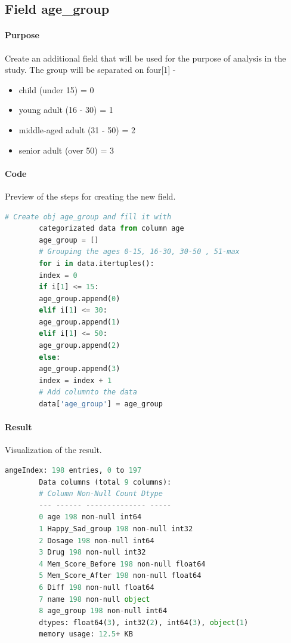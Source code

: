 \documentclass{article}
\begin{document}
    \subsection{Field age\_group}
    \paragraph{Purpose}
    Create an additional field that will be used for the purpose of analysis in the study. The group will be separated on four[1] -
    \begin{itemize}
        \item child (under 15) = 0
        \item young adult (16 - 30) = 1
        \item middle-aged adult (31 - 50) = 2
        \item senior adult (over 50) = 3
    \end{itemize}
    \paragraph{Code} Preview of the steps for creating the new field.
    \begin{lstlisting}[language=Python]
        # Create obj age_group and fill it with
        categorizated data from column age
        age_group = []
        # Grouping the ages 0-15, 16-30, 30-50 , 51-max
        for i in data.itertuples():
        index = 0
        if i[1] <= 15:
        age_group.append(0)
        elif i[1] <= 30:
        age_group.append(1)
        elif i[1] <= 50:
        age_group.append(2)
        else:
        age_group.append(3)
        index = index + 1
        # Add columnto the data
        data['age_group'] = age_group
    \end{lstlisting}
    \paragraph{Result}
    Visualization of the result.
    \begin{lstlisting}[language=Python]
        angeIndex: 198 entries, 0 to 197
        Data columns (total 9 columns):
        # Column Non-Null Count Dtype
        --- ------ -------------- -----
        0 age 198 non-null int64
        1 Happy_Sad_group 198 non-null int32
        2 Dosage 198 non-null int64
        3 Drug 198 non-null int32
        4 Mem_Score_Before 198 non-null float64
        5 Mem_Score_After 198 non-null float64
        6 Diff 198 non-null float64
        7 name 198 non-null object
        8 age_group 198 non-null int64
        dtypes: float64(3), int32(2), int64(3), object(1)
        memory usage: 12.5+ KB
    \end{lstlisting}
    \newpage
\end{document}
